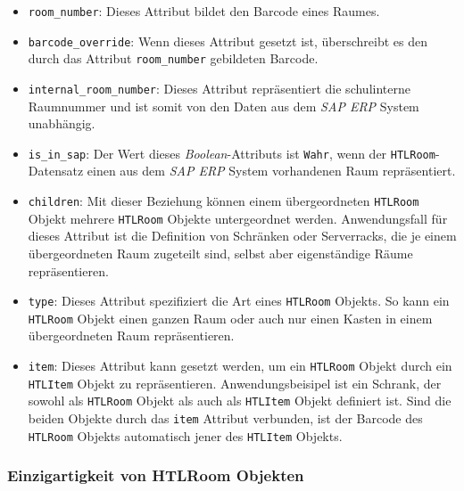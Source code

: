 \begin{itemize}
\tightlist
\item
  \texttt{room\_number}: Dieses Attribut bildet den Barcode eines
  Raumes.
\item
  \texttt{barcode\_override}: Wenn dieses Attribut gesetzt ist,
  überschreibt es den durch das Attribut \texttt{room\_number}
  gebildeten Barcode.
\item
  \texttt{internal\_room\_number}: Dieses Attribut repräsentiert die
  schulinterne Raumnummer und ist somit von den Daten aus dem
  \emph{SAP ERP}
  System unabhängig.
\item
  \texttt{is\_in\_sap}: Der Wert dieses
  \emph{Boolean}-Attributs
  ist \texttt{Wahr}, wenn der \texttt{HTLRoom}-Datensatz einen aus dem
  \emph{SAP ERP}
  System vorhandenen Raum repräsentiert.
\item
  \texttt{children}: Mit dieser Beziehung können einem übergeordneten
  \texttt{HTLRoom} Objekt mehrere \texttt{HTLRoom} Objekte untergeordnet
  werden. Anwendungsfall für dieses Attribut ist die Definition von
  Schränken oder Serverracks, die je einem übergeordneten Raum zugeteilt
  sind, selbst aber eigenständige Räume repräsentieren.
\item
  \texttt{type}: Dieses Attribut spezifiziert die Art eines
  \texttt{HTLRoom} Objekts. So kann ein \texttt{HTLRoom} Objekt einen
  ganzen Raum oder auch nur einen Kasten in einem übergeordneten Raum
  repräsentieren.
\item
  \texttt{item}: Dieses Attribut kann gesetzt werden, um ein
  \texttt{HTLRoom} Objekt durch ein \texttt{HTLItem} Objekt zu
  repräsentieren. Anwendungsbeisipel ist ein Schrank, der sowohl als
  \texttt{HTLRoom} Objekt als auch als \texttt{HTLItem} Objekt definiert
  ist. Sind die beiden Objekte durch das \texttt{item} Attribut
  verbunden, ist der Barcode des \texttt{HTLRoom} Objekts automatisch
  jener des \texttt{HTLItem} Objekts.
\end{itemize}

\hypertarget{einzigartigkeit-von-htlroom-objekten}{%
\subsubsection{Einzigartigkeit von HTLRoom
Objekten}\label{einzigartigkeit-von-htlroom-objekten}}

